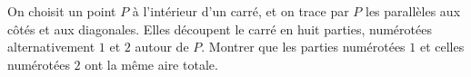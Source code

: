 On choisit un point $P$ à l'intérieur d'un carré, et on trace par $P$ les parallèles aux côtés et aux diagonales. Elles découpent le carré en huit parties, numérotées alternativement $1$ et $2$ autour de $P$. Montrer que les parties numérotées $1$ et celles numérotées $2$ ont la même aire totale.
